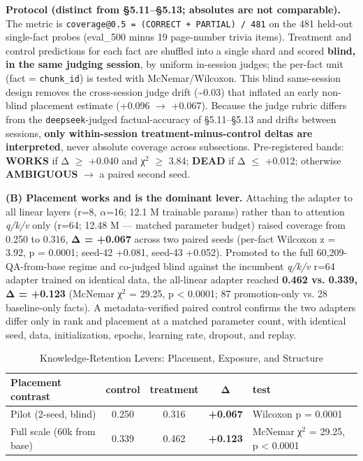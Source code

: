 \documentclass[10pt,twocolumn]{article}
\begin{document}
\textbf{Protocol (distinct from \S{}5.11--\S{}5.13; absolutes are not comparable).} The metric is \texttt{coverage@0.5 = (CORRECT + PARTIAL) / 481} on the 481 held-out single-fact probes (eval\_500 minus 19 page-number trivia items). Treatment and control predictions for each fact are shuffled into a single shard and scored \textbf{blind, in the same judging session}, by uniform in-session judges; the per-fact unit (fact = \texttt{chunk\_id}) is tested with McNemar/Wilcoxon. This blind same-session design removes the cross-session judge drift (\textasciitilde{}0.03) that inflated an early non-blind placement estimate (+0.096 $\to$ +0.067). Because the judge rubric differs from the \texttt{deepseek}-judged factual-accuracy of \S{}5.11--\S{}5.13 and drifts between sessions, \textbf{only within-session treatment-minus-control deltas are interpreted}, never absolute coverage across subsections. Pre-registered bands: \textbf{WORKS} if Δ $\geq$ +0.040 and χ$^2$ $\geq$ 3.84; \textbf{DEAD} if Δ $\leq$ +0.012; otherwise \textbf{AMBIGUOUS} $\to$ a paired second seed.


\textbf{(B) Placement works and is the dominant lever.} Attaching the adapter to all linear layers (r=8, $\alpha$=16; 12.1 M trainable params) rather than to attention \textit{q/k/v} only (r=64; 12.48 M --- matched parameter budget) raised coverage from 0.250 to 0.316, \textbf{Δ = +0.067} across two paired seeds (per-fact Wilcoxon z = 3.92, p = 0.0001; seed-42 +0.081, seed-43 +0.052). Promoted to the full 60,209-QA-from-base regime and co-judged blind against the incumbent \textit{q/k/v} r=64 adapter trained on identical data, the all-linear adapter reached \textbf{0.462 vs. 0.339, Δ = +0.123} (McNemar χ$^2$ = 29.25, p < 0.0001; 87 promotion-only vs. 28 baseline-only facts). A metadata-verified paired control confirms the two adapters differ only in rank and placement at a matched parameter count, with identical seed, data, initialization, epochs, learning rate, dropout, and replay.


\begin{table}[htbp]
  \centering\small
  \caption{Knowledge-Retention Levers: Placement, Exposure, and Structure}
  \label{tab:knowledge-retention-levers-placement-exposure-and-structure}
  \begin{tabularx}{\textwidth}{LcccL}
  \toprule
    Placement contrast & control & treatment & Δ & test \\
  \midrule
  \midrule
  Pilot (2-seed, blind) & 0.250 & 0.316 & \textbf{+0.067} & Wilcoxon p = 0.0001 \\
  Full scale (60k from base) & 0.339 & 0.462 & \textbf{+0.123} & McNemar χ$^2$ = 29.25, p < 0.0001 \\
  \bottomrule
  \end{tabularx}
\end{table}
\end{document}
